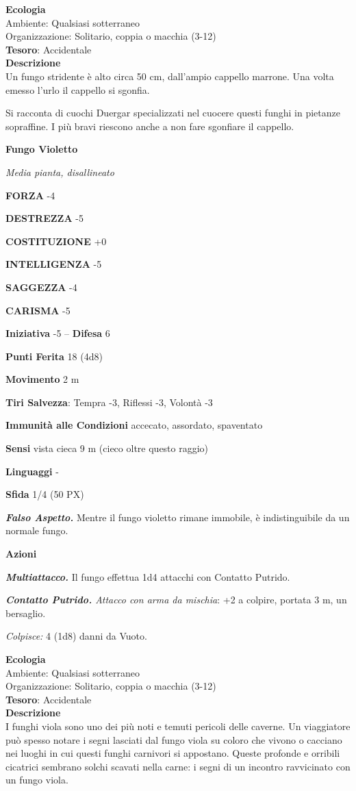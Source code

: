 \begin{multicols}{2}
\textbf{Ecologia}\\
Ambiente: Qualsiasi sotterraneo\\
Organizzazione: Solitario, coppia o macchia (3-12)\\
\textbf{Tesoro}: Accidentale\\
\textbf{Descrizione}\\
Un fungo stridente è alto circa 50 cm, dall'ampio cappello marrone. Una volta emesso l'urlo il cappello si sgonfia.

Si racconta di cuochi Duergar specializzati nel cuocere questi funghi in pietanze sopraffine. I più bravi riescono anche a non fare sgonfiare il cappello.

\medskip{}\textbf{Fungo Violetto}

\textit{Media pianta, disallineato}

\textbf{FORZA} -4

\textbf{DESTREZZA} -5

\textbf{COSTITUZIONE} +0

\textbf{INTELLIGENZA} -5

\textbf{SAGGEZZA} -4

\textbf{CARISMA} -5

\textbf{Iniziativa} -5 -- \textbf{Difesa} 6

\textbf{Punti Ferita} 18 (4d8)

\textbf{Movimento} 2 m

\textbf{Tiri Salvezza}: Tempra -3, Riflessi -3, Volontà -3

\textbf{Immunità alle Condizioni} accecato, assordato, spaventato

\textbf{Sensi} vista cieca 9 m (cieco oltre questo raggio)

\textbf{Linguaggi} -

\textbf{Sfida} 1/4 (50 PX)

\textit{\textbf{Falso Aspetto.}} Mentre il fungo violetto rimane immobile, è indistinguibile da un normale fungo.

\textbf{Azioni}

\textit{\textbf{Multiattacco.}} Il fungo effettua 1d4 attacchi con Contatto Putrido.

\textit{\textbf{Contatto Putrido.} Attacco con arma da mischia}: +2 a colpire, portata 3 m, un bersaglio.

\textit{Colpisce:} 4 (1d8) danni da Vuoto.

\textbf{Ecologia}\\
Ambiente: Qualsiasi sotterraneo\\
Organizzazione: Solitario, coppia o macchia (3-12)\\
\textbf{Tesoro}: Accidentale\\
\textbf{Descrizione}\\
I funghi viola sono uno dei più noti e temuti pericoli delle caverne. Un viaggiatore può spesso notare i segni lasciati dal fungo viola su coloro che vivono o cacciano nei luoghi in cui questi funghi carnivori si appostano. Queste profonde e orribili cicatrici sembrano solchi scavati nella carne: i segni di un incontro ravvicinato con un fungo viola.


\end{multicols}

